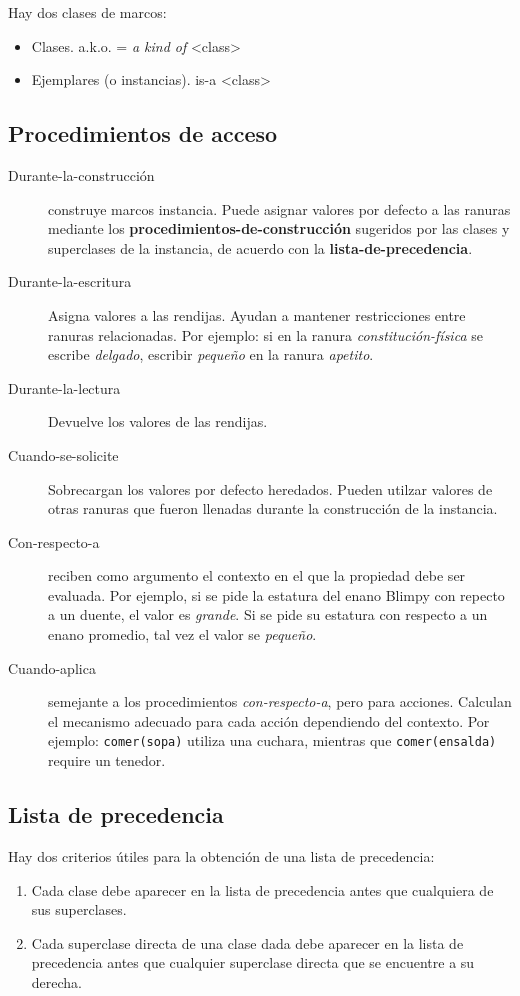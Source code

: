 Hay dos clases de marcos:
\begin{itemize}
 \item Clases. a.k.o. = \emph{a kind of} <class>
 \item Ejemplares (o instancias). is-a <class>
\end{itemize}

\subsection{Procedimientos de acceso}
\begin{description}
 \item[Durante-la-construcción] construye marcos instancia.  Puede asignar valores por defecto a las ranuras mediante los \textbf{procedimientos-de-construcción} sugeridos por las clases y superclases de la instancia, de acuerdo con la \textbf{lista-de-precedencia}.
 \item[Durante-la-escritura] Asigna valores a las rendijas.  Ayudan a mantener restricciones entre ranuras relacionadas.  Por ejemplo: si en la ranura \textit{constitución-física} se escribe \textit{delgado}, escribir \textit{pequeño} en la ranura \textit{apetito}.
 \item[Durante-la-lectura] Devuelve los valores de las rendijas.
 \item[Cuando-se-solicite] Sobrecargan los valores por defecto heredados.  Pueden utilzar valores de otras ranuras que fueron llenadas durante la construcción de la instancia.
 \item[Con-respecto-a] reciben como argumento el contexto en el que la propiedad debe ser evaluada.  Por ejemplo, si se pide la estatura del enano Blimpy con repecto a un duente, el valor es \textit{grande}.  Si se pide su estatura con respecto a un enano promedio, tal vez el valor se \textit{pequeño}.
 \item[Cuando-aplica] semejante a los procedimientos \textit{con-respecto-a}, pero para acciones.  Calculan el mecanismo adecuado para cada acción dependiendo del contexto.  Por ejemplo: \texttt{comer(sopa)} utiliza una cuchara, mientras que \texttt{comer(ensalda)} require un tenedor.
\end{description}

\subsection{Lista de precedencia}
Hay dos criterios útiles para la obtención de una lista de precedencia:
\begin{enumerate}
 \item Cada clase debe aparecer en la lista de precedencia antes que cualquiera de sus superclases.
 \item Cada superclase directa de una clase dada debe aparecer en la lista de precedencia antes que cualquier superclase directa que se encuentre a su derecha.
\end{enumerate}

